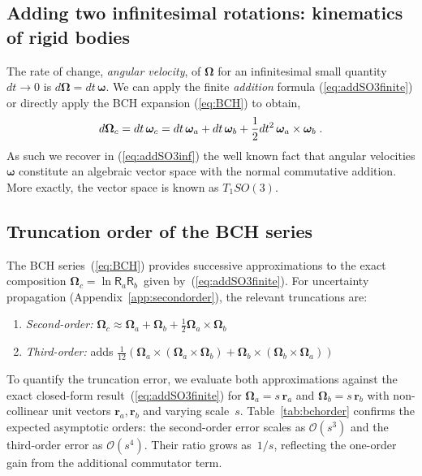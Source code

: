 \documentclass[journal]{IEEEtran}
\newcommand{\bfomega}{\boldsymbol{\omega}}
\newcommand{\bfOmega}{\boldsymbol{\Omega}}
\newcommand{\beq}{\begin{equation}}
\newcommand{\eeq}{\end{equation}}
\begin{document}
\subsection{Adding two infinitesimal rotations: kinematics of rigid bodies}
The rate of change, {\em angular velocity}, of $\bfOmega$ for an infinitesimal small quantity $dt\rightarrow 0$
is $d\bfOmega = dt\, \bfomega$. We can apply the finite {\em addition} formula (\ref{eq:addSO3finite}) or
directly apply the BCH expansion (\ref{eq:BCH}) to obtain,
\beq
    d\bfOmega_c = dt\, \bfomega_c = dt\, \bfomega_a + dt\, \bfomega_b + {1\over 2} dt^2\, \bfomega_a\times\bfomega_b\;.
    \label{eq:addSO3inf}
\eeq
As such we recover in (\ref{eq:addSO3inf}) the well known fact that angular velocities $\bfomega$
constitute an algebraic vector space with the normal commutative addition. More exactly, the
vector space is known as $T_1SO(3)$.

\subsection{Truncation order of the BCH series}
\label{app:bchorder}

The BCH series~(\ref{eq:BCH}) provides successive approximations to
the exact composition $\bfOmega_c = \ln \mathsf{R}_a\mathsf{R}_b\,$
given by~(\ref{eq:addSO3finite}). For uncertainty propagation
(Appendix~\ref{app:secondorder}), the relevant truncations are:
\begin{enumerate}
\item \emph{Second-order:} $\bfOmega_c \approx \bfOmega_a + \bfOmega_b
  + \tfrac{1}{2}\bfOmega_a\times\bfOmega_b$
\item \emph{Third-order:} adds
  $\tfrac{1}{12}(\bfOmega_a\!\times\!(\bfOmega_a\!\times\!\bfOmega_b)
  + \bfOmega_b\!\times\!(\bfOmega_b\!\times\!\bfOmega_a))$
\end{enumerate}

To quantify the truncation error, we evaluate both approximations
against the exact closed-form result~(\ref{eq:addSO3finite})
for $\bfOmega_a = s\,\mathbf{r}_a$ and $\bfOmega_b = s\,\mathbf{r}_b$
with non-collinear unit vectors
$\mathbf{r}_a,\mathbf{r}_b$ and varying scale~$s$.
Table~\ref{tab:bchorder} confirms the expected asymptotic orders:
the second-order error scales as $\mathcal{O}(s^3)$ and the third-order
error as $\mathcal{O}(s^4)$.
Their ratio grows as~$1/s$, reflecting the one-order gain
from the additional commutator term.
\end{document}
